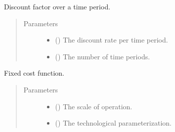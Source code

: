 \documentclass[letterpaper,10pt,english]{sphinxmanual}
\begin{document}

\begin{fulllineitems}
\label{\detokenize{doc-src/technology:technology.pv_residential_simple.discount}}
Discount factor over a time period.
\begin{quote}\begin{description}
\item[{Parameters}] \leavevmode\begin{itemize}
\item {} 
 () \textendash{} The discount rate per time period.

\item {} 
 () \textendash{} The number of time periods.

\end{itemize}

\end{description}\end{quote}

\end{fulllineitems}


\begin{fulllineitems}
\label{\detokenize{doc-src/technology:technology.pv_residential_simple.fixed_cost}}
Fixed cost function.
\begin{quote}\begin{description}
\item[{Parameters}] \leavevmode\begin{itemize}
\item {} 
 () \textendash{} The scale of operation.

\item {} 
 () \textendash{} The technological parameterization.

\end{itemize}

\end{description}\end{quote}

\end{fulllineitems}
\end{document}
